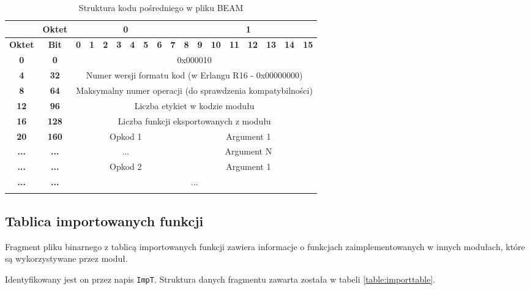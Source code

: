 \begin{longtable}{|c|c|c|c|c|c|c|c|c|c|c|c|c|c|c|c|c|c|}
\hline
         & \textbf{Oktet} & \multicolumn{8}{|c|}{\textbf{0}} & \multicolumn{8}{|c|}{\textbf{1}} \\
\hline
\textbf{Oktet} & \textbf{Bit} & \textbf{0} & \textbf{1} & \textbf{2} & \textbf{3} & \textbf{4} & \textbf{5} & \textbf{6} & \textbf{7} & \textbf{8} & \textbf{9} & \textbf{10} & \textbf{11} & \textbf{12} & \textbf{13} & \textbf{14} & \textbf{15}\\
\hline
\textbf{0} & \textbf{0} & \multicolumn{16}{|c|}{0x000010} \\[3ex]
\hline
\textbf{4} & \textbf{32} & \multicolumn{16}{|c|}{Numer wersji formatu kod (w Erlangu R16 - 0x00000000)}\\[3ex]
\hline
\textbf{8} & \textbf{64} & \multicolumn{16}{|c|}{Maksymalny numer operacji (do sprawdzenia kompatybilności)} \\[3ex]
\hline
\textbf{12} & \textbf{96} & \multicolumn{16}{|c|}{Liczba etykiet w kodzie modułu}\\[3ex]
\hline
\textbf{16} & \textbf{128} & \multicolumn{16}{|c|}{Liczba funkcji eksportowanych z modułu} \\[3ex]
\hline
\textbf{20} & \textbf{160} & \multicolumn{8}{|c|}{Opkod 1} & \multicolumn{8}{|c|}{Argument 1}  \\[3ex]
\hline
\textbf{...} & \textbf{...} & \multicolumn{8}{|c|}{...} & \multicolumn{8}{|c|}{Argument N}  \\[3ex]
\hline
\textbf{...} & \textbf{...} & \multicolumn{8}{|c|}{Opkod 2} & \multicolumn{8}{|c|}{Argument 1}  \\[3ex]
\hline
\textbf{...} & \textbf{...} & \multicolumn{16}{|c|}{...}  \\[3ex]
\hline
\caption{Struktura kodu pośredniego w pliku BEAM}
\label{table:bytecode} \\
\end{longtable}


\subsection{Tablica importowanych funkcji}
Fragment pliku binarnego z tablicą importowanych funkcji zawiera informacje o funkcjach zaimplementowanych w innych modułach, które są wykorzystywane przez moduł.

Identyfikowany jest on przez napis \texttt{ImpT}. Struktura danych fragmentu zawarta została w tabeli \ref{table:importtable}.

